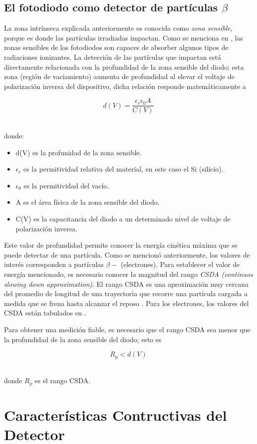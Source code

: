 \documentclass[a4paper,conference]{IEEEtran}
\begin{document}
    \subsection{El fotodiodo como detector de partículas $\beta$}
        La zona intrínseca explicada anteriormente es conocida como \emph{zona
        sensible}, porque es donde las partículas irradiadas impactan. Como se
        menciona en \cite{mpdi}, las zonas sensibles de los fotodiodos son
        capaces de absorber algunos tipos de radiaciones ionizantes. La
        detección de las partículas que impactan está directamente relacionada
        con la profundidad de la zona sensible del diodo; esta zona (región de
        vaciamiento) aumenta de profundidad al elevar el voltaje de polarización
        inversa del dispositivo, dicha relación responde matemáticamente a

        \begin{equation}
            \label{d_x}
            d(V) = \frac{\epsilon_{r}\epsilon_{0}A}{C(V)}
        \end{equation}

        \hfill \\ donde:
        \begin{itemize}
            \item d(V) es la profunidad de la zona sensible.
            \item $\epsilon_{r}$ es la permitividad relativa del material, en este caso el Si
                (silicio).
            \item $\epsilon_{0}$ es la permitividad del vacío.
            \item A es el área física de la zona sensible del diodo.
            \item C(V) es la capacitancia del diodo a un determinado nivel de
                voltaje de polarización inversa.
        \end{itemize}

        Este valor de profundidad permite conocer la energía cinética máxima que
        se puede detectar de una partícula. Como se mencionó anteriormente, los
        valores de interés corresponden a partículas $\beta-$ (electrones). Para
        establecer el valor de energía mencionado, es necesario conocer la
        magnitud del rango \emph{CSDA (continuos slowing down approximation)}.
        El rango CSDA es una aproximación muy cercana del promedio de longitud
        de una trayectoria que recorre una partícula cargada a medida que se
        frena hasta alcanzar el reposo \cite{nist}. Para los electrones, los
        valores del CSDA están tabulados en \cite{nist}.\par
        Para obtener una medición fiable, es necesario que el rango CSDA sea
        menor que la profundidad de la zona sensible del diodo; esto es

        \begin{equation*}
            R_{p} < d(V)
        \end{equation*}

        \hfill \\ donde $R_{p}$ es el rango CSDA.

    \section{Características Contructivas del Detector}



\nocite{*}
\end{document}
